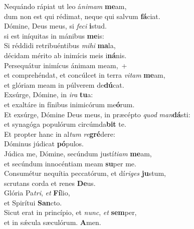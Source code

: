 \evenverse Nequándo rápiat ut leo á\textit{ni}\textit{mam} \textbf{me}am,~\*\\
\evenverse dum non est qui rédimat, neque qui salvum \textbf{fá}ciat.\\
\oddverse Dómine, Deus meus, si \textit{fe}\textit{ci} \textbf{i}stud.~\*\\
\oddverse si est iníquitas in mánibus \textbf{me}is:\\
\evenverse Si réddidi retribuéntibus \textit{mi}\textit{hi} \textbf{ma}la,~\*\\
\evenverse décidam mérito ab inimícis meis i\textbf{ná}nis.\\
\oddverse Persequátur inimícus ánimam meam,~+\\
\oddverse  et comprehéndat, et concúlcet in terra \textit{vi}\textit{tam} \textbf{me}am,~\*\\
\oddverse et glóriam meam in púlverem de\textbf{dú}cat.\\
\evenverse Exsúrge, Dómine, in \textit{i}\textit{ra} \textbf{tu}a:~\*\\
\evenverse et exaltáre in fínibus inimicórum me\textbf{ó}rum.\\
\oddverse Et exsúrge, Dómine Deus meus, in præcépto \textit{quod} \textit{man}\textbf{dá}sti:~\*\\
\oddverse et synagóga populórum circúmda\textbf{bit} te.\\
\evenverse Et propter hanc in al\textit{tum} \textit{re}\textbf{gré}dere:~\*\\
\evenverse Dóminus júdicat \textbf{pó}pulos.\\
\oddverse Júdica me, Dómine, secúndum justí\textit{ti}\textit{am} \textbf{me}am,~\*\\
\oddverse et secúndum innocéntiam meam \textbf{su}per me.\\
\evenverse Consumétur nequítia peccatórum, et dí\textit{ri}\textit{ges} \textbf{ju}stum,~\*\\
\evenverse scrutans corda et renes \textbf{De}us.\\
\oddverse Glória Pa\textit{tri}, \textit{et} \textbf{Fí}lio,~\*\\
\oddverse et Spirítui \textbf{San}cto.\\
\evenverse Sicut erat in princípio, et \textit{nunc}, \textit{et} \textbf{sem}per,~\*\\
\evenverse et in sǽcula sæculórum. \textbf{A}men.\\
